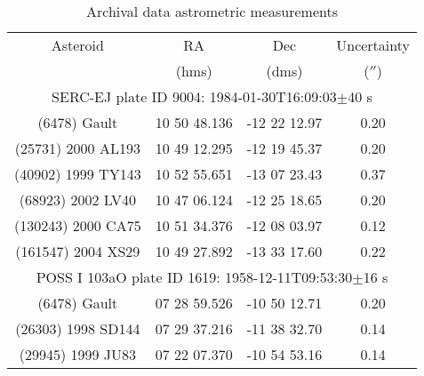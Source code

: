 \begin{table}
\caption{Archival data astrometric measurements}
\label{Tab:Ast_Meas}
\begin{tabular}{c c c c }
\hline
Asteroid & RA  & Dec & Uncertainty \\
 & (hms)  & (dms) & ($''$)\\
 \hline
\multicolumn{4}{c}{SERC-EJ plate ID 9004: 1984-01-30T16:09:03$\pm$40 s}  \\
\hline
(6478) Gault  & 10 50 48.136  & -12 22 12.97 & 0.20\\
(25731) 2000 AL193 & 10 49 12.295 & -12 19 45.37 & 0.20\\
(40902) 1999 TY143 & 10 52 55.651 & -13 07 23.43 & 0.37 \\
(68923) 2002 LV40  & 10 47 06.124  & -12 25 18.65 & 0.20\\
(130243) 2000 CA75 & 10 51 34.376 & -12 08 03.97 & 0.12\\
(161547) 2004 XS29 & 10 49 27.892 & -13 33 17.60 & 0.22\\
\hline
\multicolumn{4}{c}{POSS I 103aO plate ID 1619: 1958-12-11T09:53:30$\pm$16 s } \\
\hline
(6478) Gault & 07 28 59.526 & -10 50 12.71 & 0.20\\
(26303) 1998 SD144 & 07 29 37.216 & -11 38 32.70 & 0.14\\
(29945) 1999 JU83  & 07 22 07.370 & -10 54 53.16 & 0.14\\
\hline
\end{tabular}
\end{table}